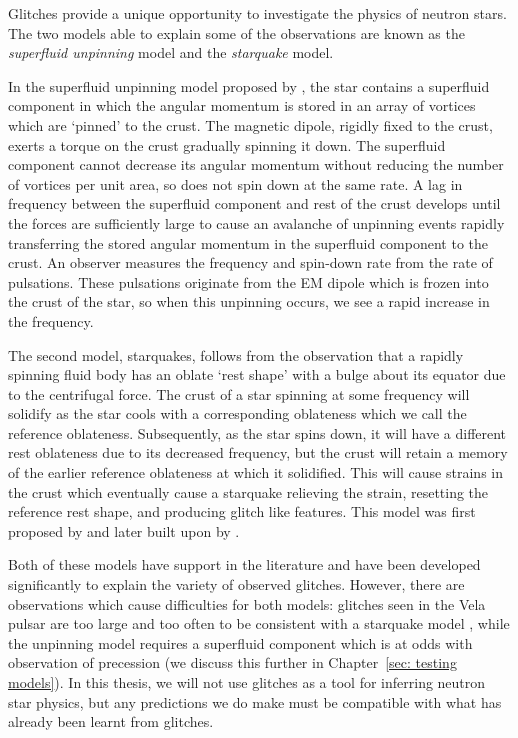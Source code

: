 
Glitches provide a unique opportunity to investigate the physics of neutron
stars. The two models able to explain some of the observations are known as the
\emph{superfluid unpinning} model and the \emph{starquake} model.

In the superfluid unpinning model proposed by \citet{Anderson1975}, the star
contains a superfluid component in which the angular momentum is stored in an
array of vortices which are `pinned' to the crust. The magnetic dipole, rigidly
fixed to the crust, exerts a torque on the crust gradually spinning it down.
The superfluid component cannot decrease its angular momentum without reducing
the number of vortices per unit area, so does not spin down at the same rate. A
lag in frequency between the superfluid component and rest of the crust
develops until the forces are sufficiently large to cause an avalanche of
unpinning events rapidly transferring the stored angular momentum in the
superfluid component to the crust. An observer measures the frequency and
spin-down rate from the rate of pulsations. These pulsations originate from the
EM dipole which is frozen into the crust of the star, so when this unpinning
occurs, we see a rapid increase in the frequency.

The second model, starquakes, follows from the observation that a rapidly
spinning fluid body has an oblate `rest shape' with a bulge about its equator
due to the centrifugal force. The crust of a star spinning at some frequency
will solidify as the star cools with a corresponding oblateness which we call
the reference oblateness. Subsequently, as the star spins down, it will have a
different rest oblateness due to its decreased frequency, but the crust will
retain a memory of the earlier reference oblateness at which it solidified.
This will cause strains in the crust which eventually cause a starquake
relieving the strain, resetting the reference rest shape, and producing glitch
like features. This model was first proposed by \citet{Ruderman1969} and later
built upon by \citet{Baym1971}.

Both of these models have support in the literature and have been developed
significantly to explain the variety of observed glitches. However, there are
observations which cause difficulties for both models: glitches seen in the
Vela pulsar are too large and too often to be consistent with a starquake model
\citep{chamel2008physics}, while the unpinning model requires a superfluid
component which is at odds with observation of precession (we discuss this
further in Chapter~\ref{sec: testing models}). In this thesis, we will not use
glitches as a tool for inferring neutron star physics, but any predictions we
do make must be compatible with what has already been learnt from glitches.



